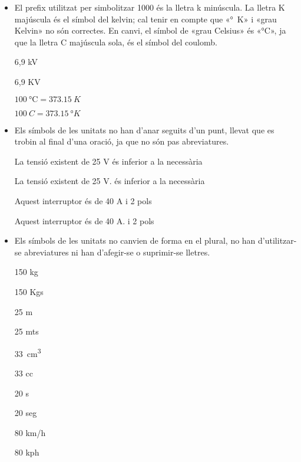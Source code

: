 \begin{itemize}

\item El prefix utilitzat per simbolitzar 1000 és la lletra k minúscula.  La lletra K majúscula és el símbol del  kelvin; cal tenir en compte que «\unit{\degree K}»  i «grau Kelvin» no són correctes. En canvi, el símbol de «grau Celsius» és «\unit{\degreeCelsius}», ja que la lletra C majúscula sola, és el símbol del coulomb.

\textcolor{Green}\faCheckSquare{} 6,9  kV

\textcolor{Red}\faTimesCircle{} 6,9 KV

\textcolor{Green}\faCheckSquare{} $\qty{100}{\degreeCelsius} = \qty{373,15}{K}$

\textcolor{Red}\faTimesCircle{} $\qty{100}{C} = \qty{373,15}{\degree K}$

\item Els símbols de les unitats no han d'anar seguits d'un punt, llevat que es trobin al final d'una oració, ja que no són pas
abreviatures.

\textcolor{Green}\faCheckSquare{} La tensió existent de 25 V és inferior a la necessària

\textcolor{Red}\faTimesCircle{} La tensió existent de 25 V. és inferior a la necessària

\textcolor{Green}\faCheckSquare{}  Aquest interruptor és de 40 A i 2 pols

\textcolor{Red}\faTimesCircle{}  Aquest interruptor és de 40 A. i 2 pols


\item Els símbols de les unitats no canvien de forma en el plural, no han
d'utilitzar-se abreviatures ni han d'afegir-se o suprimir-se
lletres.

\textcolor{Green}\faCheckSquare{} 150 kg

\textcolor{Red}\faTimesCircle{} 150 Kgs

\textcolor{Green}\faCheckSquare{} 25 m

\textcolor{Red}\faTimesCircle{} 25 mts

\textcolor{Green}\faCheckSquare{} \qty{33}{cm^3}

\textcolor{Red}\faTimesCircle{} 33 cc

\textcolor{Green}\faCheckSquare{} 20 s

\textcolor{Red}\faTimesCircle{} 20 seg

\textcolor{Green}\faCheckSquare{} 80 km/h

\textcolor{Red}\faTimesCircle{} 80 kph


\end{itemize}

